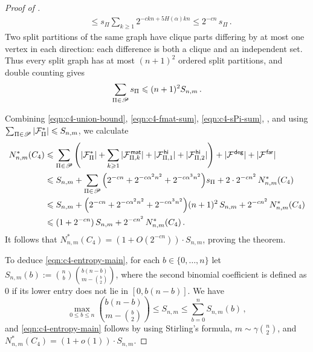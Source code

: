 \begin{proof}[Proof of ]
\begin{equation}
\begin{aligned}
&\leq s_\Pi\sum_{k\geq1}2^{-ckn+5H(\alpha)kn} \leq 2^{-cn}\,s_\Pi \,.
\end{aligned}
\end{equation}
Two split partitions of the same graph have clique parts differing by at most one vertex in each direction: each difference is both a clique and an independent set. Thus every split graph has at most $(n+1)^2$ ordered split partitions, and double counting gives
\begin{equation}\label{eqn:c4-sPi-sum}
\sum_{\Pi\in{\mathscr P}}s_\Pi\leqslant(n+1)^2S_{n,m}\,.
\end{equation}

Combining \eqref{eqn:c4-union-bound}, \eqref{eqn:c4-fmat-sum}, \eqref{eqn:c4-sPi-sum}, , and using $\sum_{\Pi\in{\mathscr P}}|{\mathcal F}^\ast_\Pi|\leqslant S_{n,m}$, we calculate
\begin{align*}
N^\ast_{n,m}(C_4) &\leqslant \sum_{\Pi\in{\mathscr P}}\Bigg(|{\mathcal F}^\ast_\Pi|+\sum_{k\geqslant1}|{\mathcal F}^{\hspace{0.2mm}\mathsf{mat}}_{\Pi,k}|+|{\mathcal F}^{\hspace{0.2mm}\mathsf{hi}}_{\Pi,1}|+|{\mathcal F}^{\hspace{0.2mm}\mathsf{hi}}_{\Pi,2}|\Bigg)+\lvert{\mathcal F}^{\hspace{0.2mm}\mathsf{deg}}\rvert+\lvert{\mathcal F}^{\hspace{0.2mm}\mathsf{far}}\rvert \\
&\leqslant S_{n,m} + \sum_{\Pi\in{\mathscr P}}\Big(2^{-cn}+2^{-c\alpha^2n^2}+2^{-c\alpha^3n^2}\Big)s_\Pi +2\cdot2^{-cn^2}\,N^\ast_{n,m}(C_4) \\
&\leqslant S_{n,m} + \Big(2^{-cn}+2^{-c\alpha^2n^2}+2^{-c\alpha^3n^2}\Big)(n+1)^2\,S_{n,m} + 2^{-cn^2}\,N^\ast_{n,m}(C_4) \\
&\leqslant (1+2^{-cn})\,S_{n,m}+2^{-cn^2}\,N^\ast_{n,m}(C_4) \,.
\end{align*}
It follows that $N^\ast_{n,m}(C_4)=(1+O(2^{-cn}))\cdot S_{n,m}$, proving the theorem.

To deduce \eqref{eqn:c4-entropy-main}, for each $b\in\{0,\dots,n\}$ let $S_{n,m}(b):=\binom{n}{b}\binom{b(n-b)}{m-\binom{b}{2}}$, where the second binomial coefficient is defined as $0$ if its lower entry does not lie in $[0,b(n-b)]$. We have
$$\max_{0\leq b\leq n}\binom{b(n-b)}{m-\binom{b}{2}}\leq S_{n,m}\leq\sum_{b=0}^n S_{n,m}(b)\,,$$
and \eqref{eqn:c4-entropy-main} follows by using Stirling's formula, $m\sim\gamma\binom{n}{2}$, and $N^\ast_{n,m}(C_4)=(1+o(1))\cdot S_{n,m}$.
\end{proof}
